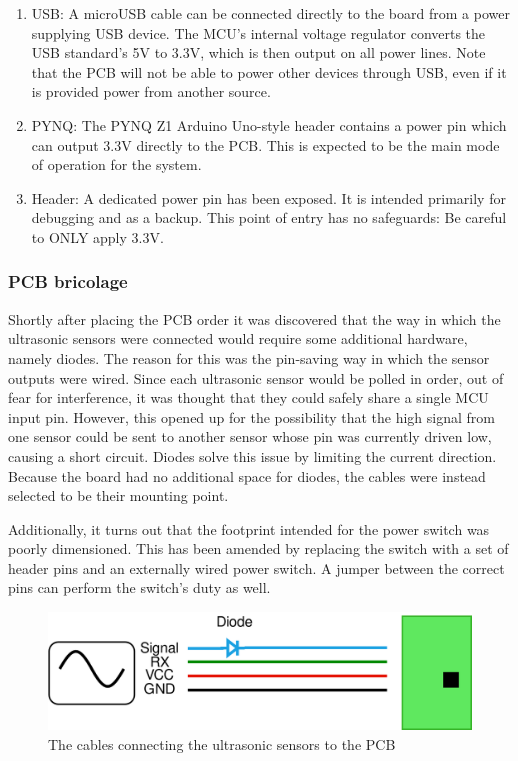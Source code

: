 \begin{enumerate}
    \item USB: A microUSB cable can be connected directly to the board from a power supplying USB device. The MCU's internal voltage regulator converts the USB standard's 5V to 3.3V, which is then output on all power lines. Note that the PCB will not be able to power other devices through USB, even if it is provided power from another source. 
    \item PYNQ: The PYNQ Z1 Arduino Uno-style header contains a power pin which can output 3.3V directly to the PCB. This is expected to be the main mode of operation for the system.
    \item Header: A dedicated power pin has been exposed. It is intended primarily for debugging and as a backup. This point of entry has no safeguards: Be careful to ONLY apply 3.3V. 
\end{enumerate}

\subsubsection{PCB bricolage}
Shortly after placing the PCB order it was discovered that the way in which the ultrasonic sensors were connected would require some additional hardware, namely diodes. The reason for this was the pin-saving way in which the sensor outputs were wired. Since each ultrasonic sensor would be polled in order, out of fear for interference, it was thought that they could safely share a single MCU input pin. However, this opened up for the possibility that the high signal from one sensor could be sent to another sensor whose pin was currently driven low, causing a short circuit. Diodes solve this issue by  limiting the current direction. Because the board had no additional space for diodes, the cables were instead selected to be their mounting point.

Additionally, it turns out that the footprint intended for the power switch was poorly dimensioned. This has been amended by replacing the switch with a set of header pins and an externally wired power switch. A jumper between the correct pins can perform the switch's duty as well. 

\begin{figure}
    \centering
    \includegraphics[scale=0.25]{Images/Cable.png}
    \caption{The cables connecting the ultrasonic sensors to the PCB}
    \label{fig:cable}
\end{figure}